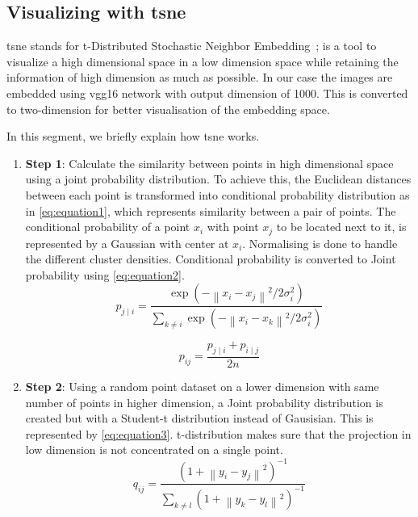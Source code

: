 \subsection{Visualizing with \gls{tsne}}\label{subsec:visualizing-with-tsne}
\gls{tsne} stands for t-Distributed Stochastic Neighbor Embedding~\cite{vanDerMaaten2008}; is a tool to visualize a high dimensional space in a low dimension space while retaining the information of high dimension as much as possible.
In our case the images are embedded using \gls{vgg}16 network with output dimension of 1000.
This is converted to two-dimension for better visualisation of the embedding space.

In this segment, we briefly explain how \gls{tsne} works.

\begin{enumerate}
    \item \textbf{Step 1}: Calculate the similarity between points in high dimensional space using a joint probability distribution.
        To achieve this, the Euclidean distances between each point is transformed into conditional probability distribution as in \autoref{eq:equation1}, which represents similarity between a pair of points.
        The conditional probability of a point $x_i$ with point $x_j$ to be located next to it, is represented by a Gaussian with center at $x_i$.
        Normalising is done to handle the different cluster densities.
        Conditional probability is converted to Joint probability using \autoref{eq:equation2}.
    \begin{equation}
        p_{j \mid i}=\frac{\exp \left(-\left\|x_{i}-x_{j}\right\|^{2} / 2 \sigma_{i}^{2}\right)}{\sum_{k \neq i} \exp \left(-\left\|x_{i}-x_{k}\right\|^{2} / 2 \sigma_{i}^{2}\right)}
        \label{eq:equation1}
    \end{equation}

    \begin{equation}
        p_{i j}=\frac{p_{j \mid i}+p_{i \mid j}}{2 n}
        \label{eq:equation2}
    \end{equation}

    \item \textbf{Step 2}: Using a random point dataset on a lower dimension with same number of points in higher dimension, a Joint probability distribution is created but with a Student-t distribution instead of Gausisian.
    This is represented by \autoref{eq:equation3}.
    t-distribution makes sure that the projection in low dimension is not concentrated on a single point.
    \begin{equation}
        q_{ij} = \frac{(1+\left \| y_{i}-y_{j} \right \|^{2})^{-1}}{\sum _{k\neq l} (1+\left \| y_{k}-y_{l} \right \|^{2})^{-1}}
        \label{eq:equation3}
    \end{equation}


\end{enumerate}
